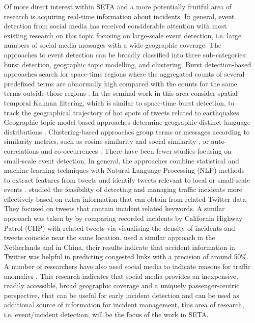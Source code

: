 \documentclass{article}
\begin{document}
Of more direct interest within SETA and a more potentially fruitful area of research is acquiring real-time information about incidents. In general, event detection from social media has received considerable attention with most existing research on this topic focusing on large-scale event detection, i.e. large numbers of social media messages with a wide geographic coverage. The approaches to event detection can be broadly classified into three sub-categories: burst detection, geographic topic modelling, and clustering. Burst detection-based approaches search for space-time regions where the aggregated counts of several predefined terms are abnormally high compared with the counts for the same terms outside those regions \citep{lappas2012spatiotemporal}. In the seminal work in this area \cite{sakaki2010earthquake} consider spatial-temporal Kalman filtering, which is similar to space-time burst detection, to track the geographical trajectory of hot spots of tweets related to earthquakes. Geographic topic model-based approaches determine geographic distinct language distributions \citep{yin2011geographical,hong2012discovering}. Clustering-based approaches group terms or messages according to similarity metrics, such as cosine similarity and social similarity \citep{yin2011geographical}, or auto-correlations \citep{weng2011event} and co-occurrences \citep{sayyadi2009event,watanabe2011jasmine}. There have been fewer studies focusing on small-scale event detection. In general, the approaches combine statistical and machine learning techniques with Natural Language Processing (NLP) methods to extract features from tweets and identify tweets relevant to local or small-scale events \citep{agarwal2012catching, schulz2013see}. \cite{fu2015social} studied the feasibility of detecting and managing traffic incidents more effectively based on extra information that can obtain from related Twitter data. They focused on tweets that contain incident related keywords. A similar approach was taken by \cite{mai2013twitter} by comparing recorded incidents by California Highway Patrol (CHP) with related tweets via visualising the density of incidents and tweets coincide near the same location. \cite{steur2015twitter} used a similar approach in the Netherlands and \cite{chen2014road} in China, their results indicate that accident information in Twitter was helpful in predicting congested links with a precision of around 50\%. A number of researchers have also used social media to indicate reasons for traffic anomalies \citep{daly2013westland, pan2013crowd, wang2015tweeting}. This research indicates that social media provides an inexpensive, readily accessible, broad geographic coverage and a uniquely passenger-centric perspective, that can be useful for early incident detection and can be used as additional source of information for incident management, this area of research, i.e. event/incident detection, will be the focus of the work in SETA.
\end{document}
